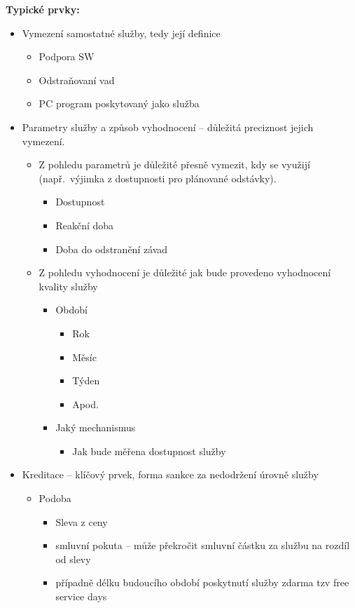 \noindent\textbf{Typické prvky:}
\begin{itemize}[noitemsep]
    \item Vymezení samostatné služby, tedy její definice
    \begin{itemize}[noitemsep]
        \item Podpora SW
        \item Odstraňovaní vad
        \item PC program poskytovaný jako služba
    \end{itemize}
    \item Parametry služby a způsob vyhodnocení -- důležitá preciznost jejich vymezení.
    \begin{itemize}[noitemsep]
        \item Z pohledu parametrů je důležité přesně vymezit, kdy se využijí (např.\ výjimka z dostupnosti pro plánované odstávky).
        \begin{itemize}[noitemsep]
            \item Dostupnost
            \item Reakční doba
            \item Doba do odstranění závad
        \end{itemize}
        \item  Z pohledu vyhodnocení je důležité jak bude provedeno vyhodnocení kvality služby
        \begin{itemize}[noitemsep]
            \item Období
            \begin{itemize}[noitemsep]
                \item Rok
                \item Měsíc
                \item Týden
                \item Apod.
            \end{itemize}
            \item Jaký mechanismus
            \begin{itemize}[noitemsep]
                \item Jak bude měřena dostupnost služby
            \end{itemize}
        \end{itemize}
    \end{itemize}
    \item Kreditace -- klíčový prvek, forma sankce za nedodržení úrovně služby
    \begin{itemize}[noitemsep]
        \item Podoba
        \begin{itemize}[noitemsep]
            \item  Sleva z ceny
            \item smluvní pokuta -- může překročit smluvní částku za službu na rozdíl od slevy
            \item případně délku budoucího období poskytnutí služby zdarma tzv free service days
        \end{itemize}
    \end{itemize}
\end{itemize}


